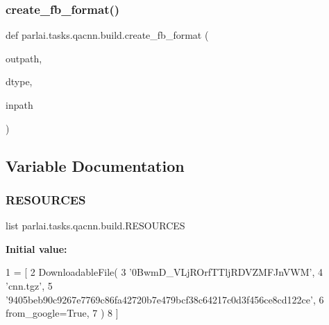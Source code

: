 \mbox{\label{namespaceparlai_1_1tasks_1_1qacnn_1_1build_add8d5f440ef973d77d8f63cc11197dce}} 
\subsubsection{\texorpdfstring{create\+\_\+fb\+\_\+format()}{create\_fb\_format()}}
{\footnotesize\ttfamily def parlai.\+tasks.\+qacnn.\+build.\+create\+\_\+fb\+\_\+format (\begin{DoxyParamCaption}\item[{}]{outpath,  }\item[{}]{dtype,  }\item[{}]{inpath }\end{DoxyParamCaption})}



\subsection{Variable Documentation}
\mbox{\label{namespaceparlai_1_1tasks_1_1qacnn_1_1build_aa5fbabbd9a51f4ecafc2a7da3ee8c130}} 
\subsubsection{\texorpdfstring{R\+E\+S\+O\+U\+R\+C\+ES}{RESOURCES}}
{\footnotesize\ttfamily list parlai.\+tasks.\+qacnn.\+build.\+R\+E\+S\+O\+U\+R\+C\+ES}

{\bfseries Initial value\+:}
\begin{DoxyCode}
1 =  [
2     DownloadableFile(
3         \textcolor{stringliteral}{'0BwmD\_VLjROrfTTljRDVZMFJnVWM'},
4         \textcolor{stringliteral}{'cnn.tgz'},
5         \textcolor{stringliteral}{'9405beb90c9267e7769c86fa42720b7e479bcf38c64217c0d3f456ce8cd122ce'},
6         from\_google=\textcolor{keyword}{True},
7     )
8 ]
\end{DoxyCode}
